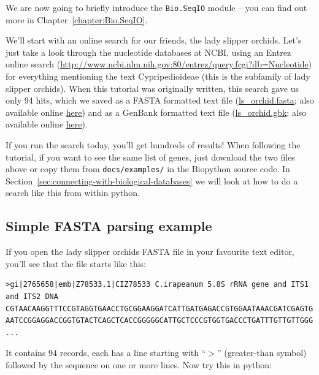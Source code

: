 \documentclass{report}
\begin{document}
We are now going to briefly introduce the \verb|Bio.SeqIO| module -- you can find out more in Chapter~\ref{chapter:Bio.SeqIO}.

We'll start with an online search for our friends, the lady slipper orchids. Let's just take a look through the nucleotide databases at NCBI, using an Entrez online search (\url{http://www.ncbi.nlm.nih.gov:80/entrez/query.fcgi?db=Nucleotide}) for everything mentioning the text Cypripedioideae (this is the subfamily of lady slipper orchids). When this tutorial was originally written, this search gave us only 94 hits, which we saved as a FASTA formatted text file (\href{examples/ls_orchid.fasta}{ls\_orchid.fasta}; also available online \href{http://biopython.org/DIST/docs/tutorial/examples/ls_orchid.fasta}{here}) and as a GenBank formatted text file (\href{examples/ls_orchid.gbk}{ls\_orchid.gbk}; also available online \href{http://biopython.org/DIST/docs/tutorial/examples/ls_orchid.gbk}{here}).


If you run the search today, you'll get hundreds of results!  When following the tutorial, if you want to see the same list of genes, just download the two files above or copy them from \verb|docs/examples/| in the Biopython source code.  In Section~\ref{sec:connecting-with-biological-databases} we will look at how to do a search like this from within python.

\subsection{Simple FASTA parsing example}
\label{sec:fasta-parsing}

If you open the lady slipper orchids FASTA file in your favourite text editor, you'll see that the file starts like this:

\begin{verbatim}
>gi|2765658|emb|Z78533.1|CIZ78533 C.irapeanum 5.8S rRNA gene and ITS1 and ITS2 DNA
CGTAACAAGGTTTCCGTAGGTGAACCTGCGGAAGGATCATTGATGAGACCGTGGAATAAACGATCGAGTG
AATCCGGAGGACCGGTGTACTCAGCTCACCGGGGGCATTGCTCCCGTGGTGACCCTGATTTGTTGTTGGG
...
\end{verbatim}

It contains 94 records, each has a line starting with ``$>$'' (greater-than symbol) followed by the sequence on one or more lines.  Now try this in python:
\end{document}
